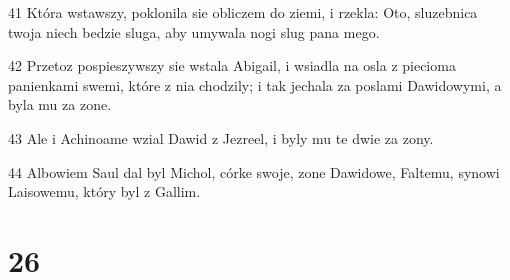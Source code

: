 \par 41 Która wstawszy, poklonila sie obliczem do ziemi, i rzekla: Oto, sluzebnica twoja niech bedzie sluga, aby umywala nogi slug pana mego.
\par 42 Przetoz pospieszywszy sie wstala Abigail, i wsiadla na osla z piecioma panienkami swemi, które z nia chodzily; i tak jechala za poslami Dawidowymi, a byla mu za zone.
\par 43 Ale i Achinoame wzial Dawid z Jezreel, i byly mu te dwie za zony.
\par 44 Albowiem Saul dal byl Michol, córke swoje, zone Dawidowe, Faltemu, synowi Laisowemu, który byl z Gallim.

\chapter{26}

